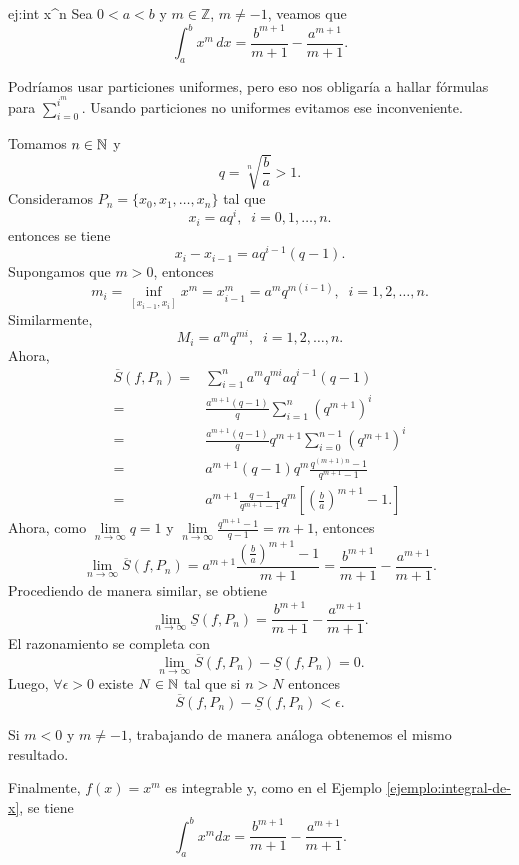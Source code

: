\begin{ejemplo}{ej:int x^n} Sea $0< a<b$ y $m\in\mathbb{Z}$, $m\neq -1$,  veamos que 
\[
 \int_a^b x^m \,dx=\frac{b^{m+1}}{m+1}-\frac{a^{m+1}}{m+1}.
\]

\begin{demo}
Podr\'iamos usar particiones uniformes, pero eso nos obligar\'ia a hallar f\'ormulas para $\sum\limits_{i=0}^{i^m}$. Usando particiones no uniformes evitamos ese inconveniente. 

Tomamos $n \in \mathbb{N}$ y 
\[
q=\sqrt[n]{\frac{b}{a}}>1.
\]
Consideramos $P_n=\{x_0,x_1,\ldots,x_n\}$ tal que
\[
x_i=aq^i, \;\;i=0,1,\ldots,n.
\]
entonces se tiene
\[
x_i-x_{i-1}=aq^{i-1}(q-1).
\]
Supongamos que $m>0$, entonces
\[
m_i=\inf\limits_{[x_{i-1},x_i]} x^m=x_{i-1}^m=a^m q^{m(i-1)}, \;\;i=1,2,\ldots,n.
\]
Similarmente, 
\[
M_i=a^mq^{mi},\;\;i=1,2,\ldots,n.
\]
Ahora, 
\[
\begin{split}
\overline{S}(f,P_n)=&
\sum\limits_{i=1}^n a^m q^{mi} aq^{i-1}(q-1)
\\
=&\frac{a^{m+1}(q-1)}{q}
\sum\limits_{i=1}^n (q^{m+1})^i
\\
=& \frac{a^{m+1}(q-1)}{q}q^{m+1}
\sum\limits_{i=0}^{n-1} (q^{m+1})^i
\\
=& a^{m+1}(q-1) q^m 
\frac{q^{(m+1)n }-1}{q^{m+1}-1}
\\
=&
a^{m+1}  \frac{q-1}{q^{m+1}-1} q^m \left[ \left(\frac{b}{a}\right)^{m+1}-1.\right]
\end{split}
\]
Ahora, como $\lim\limits_{n \to \infty} q=1$ y 
$
\lim\limits_{n \to \infty} \frac{q^{m+1}-1}{q-1}=m+1
$, entonces
\[
\lim\limits_{n \to \infty} \overline{S}(f,P_n)=a^{m+1}
\frac{\left(\frac{b}{a}\right)^{m+1}-1}{m+1}=\frac{b^{m+1}}{m+1}-\frac{a^{m+1}}{m+1}.
\]
Procediendo de manera similar, se obtiene
\[
\lim\limits_{n \to \infty} \underline{S}(f,P_n)=
\frac{b^{m+1}}{m+1}-\frac{a^{m+1}}{m+1}.
\]
El razonamiento se completa con 
\[
\lim\limits_{n \to \infty}
\overline{S}(f,P_n)-\underline{S}(f, P_n)=0.
\]
Luego, $\forall \epsilon>0$ existe $N\in \mathbb{N}$ tal que si $n>N$ entonces
\[\overline{S}(f,P_n)-\underline{S}(f, P_n)<\epsilon.\]

Si $m<0$  y $m \neq -1$, trabajando de manera an\'aloga obtenemos el mismo resultado. 

Finalmente, $f(x)=x^m$ es integrable  y, como en el Ejemplo \ref{ejemplo:integral-de-x}, se tiene
\[\int_a^b x^m dx=\frac{b^{m+1}}{m+1}-\frac{a^{m+1}}{m+1}.\]
\end{demo}
\end{ejemplo}


